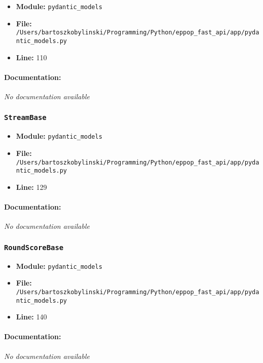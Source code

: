 \documentclass[11pt,a4paper]{article}
\begin{document}
\begin{itemize}
    \item \textbf{Module:} \texttt{pydantic\_models}
    \item \textbf{File:} \texttt{/Users/bartoszkobylinski/Programming/Python/eppop\_fast\_api/app/pydantic\_models.py}
    \item \textbf{Line:} 110
\end{itemize}

\paragraph{Documentation:} \textit{No documentation available}


\vspace{1em}
\subsubsection{\texttt{StreamBase}}

\begin{itemize}
    \item \textbf{Module:} \texttt{pydantic\_models}
    \item \textbf{File:} \texttt{/Users/bartoszkobylinski/Programming/Python/eppop\_fast\_api/app/pydantic\_models.py}
    \item \textbf{Line:} 129
\end{itemize}

\paragraph{Documentation:} \textit{No documentation available}


\vspace{1em}
\subsubsection{\texttt{RoundScoreBase}}

\begin{itemize}
    \item \textbf{Module:} \texttt{pydantic\_models}
    \item \textbf{File:} \texttt{/Users/bartoszkobylinski/Programming/Python/eppop\_fast\_api/app/pydantic\_models.py}
    \item \textbf{Line:} 140
\end{itemize}

\paragraph{Documentation:} \textit{No documentation available}
\end{document}
